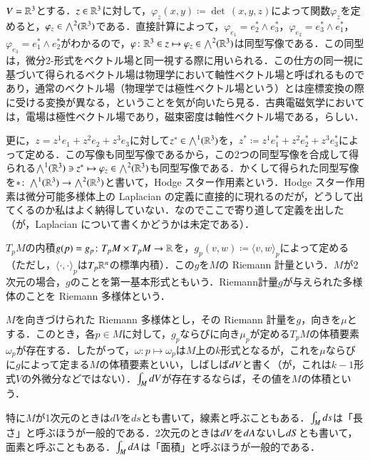 \begin{exm}
$V = \mathbb{R}^3$とする．$z \in \mathbb{R}^3$に対して，$\varphi_z(x,y) \coloneqq \det\, (x,y,z)$によって関数$\varphi_z$を定めると，$\varphi_z \in \bigwedge^2(\mathbb{R}^3)$である．直接計算によって，$\varphi_{e_1} = e_2^* \wedge e_3^*$，$\varphi_{e_2} = e_3^* \wedge e_1^*$，$\varphi_{e_3} = e_1^* \wedge e_2^*$がわかるので，$\varphi \colon \mathbb{R}^3 \in z \mapsto \varphi_z \in \bigwedge^2(\mathbb{R}^3)$は同型写像である．この同型は，微分2-形式をベクトル場と同一視する際に用いられる．この仕方の同一視に基づいて得られるベクトル場は物理学において軸性ベクトル場と呼ばれるものであり，通常のベクトル場（物理学では極性ベクトル場という）とは座標変換の際に受ける変換が異なる，ということを気が向いたら見る．古典電磁気学においては，電場は極性ベクトル場であり，磁束密度は軸性ベクトル場である，らしい．
\end{exm}

\begin{exm}
更に，$z = z^1 e_1 + z^2 e_2 + z^3 e_3$に対して$z^* \in \bigwedge^1(\mathbb{R}^3)$を，$z^* \coloneqq z^1 e_1^* + z^2 e_2^* + z^3 e_3^*$によって定める．この写像も同型写像であるから，この2つの同型写像を合成して得られる$\bigwedge^1(\mathbb{R}^3) \ni z^* \mapsto \varphi_z \in \bigwedge^2(\mathbb{R}^3)$も同型写像である．かくして得られた同型写像を$* \colon \bigwedge^1(\mathbb{R}^3) \to \bigwedge^2(\mathbb{R}^3)$と書いて，Hodge スター作用素という．Hodge スター作用素は微分可能多様体上の Laplacian の定義に直接的に現れるのだが，どうして出てくるのか私はよく納得していない．なのでここで寄り道して定義を出した（が，Laplacian について書くかどうかは未定である）．
\end{exm}

\begin{defi}
$T_pM$の内積$g(p) = g_p \colon T_pM \times T_pM \to \mathbb{R}$を，$g_p(v,w) \coloneqq \langle v, w\rangle_p$によって定める（ただし，$\langle\cdot,\cdot\rangle_p$は$T_p\mathbb{R}^n$の標準内積）．この$g$を$M$の Riemann 計量という．$M$が2次元の場合，$g$のことを第一基本形式ともいう．Riemann計量$g$が与えられた多様体のことを Riemann 多様体という．
\end{defi}

\begin{defi}
$M$を向きづけられた Riemann 多様体とし，その Riemann 計量を$g$，向きを$\mu$とする．このとき，各$p \in M$に対して，$g_p$ならびに向き$\mu_p$が定める$T_pM$の体積要素$\omega_p$が存在する．したがって，$\omega \colon p \mapsto \omega_p$は$M$上の$k$形式となるが，これを$\mu$ならびに$g$によって定まる$M$の体積要素といい，しばしば$\mathop{}\!d V$と書く（が，これは$k-1$形式$V$の外微分などではない）．$\int_M \mathop{}\!d V$が存在するならば，その値を$M$の体積という．

特に$M$が1次元のときは$dV$を$ds$とも書いて，線素と呼ぶこともある．$\int_M \mathop{}\!d s$は「長さ」と呼ぶほうが一般的である．2次元のときは$\mathop{}\!d V$を$\mathop{}\!d A$ないし$\mathop{}\!d S$とも書いて，面素と呼ぶこともある．$\int_M \mathop{}\!d A$は「面積」と呼ぶほうが一般的である．
\end{defi}

